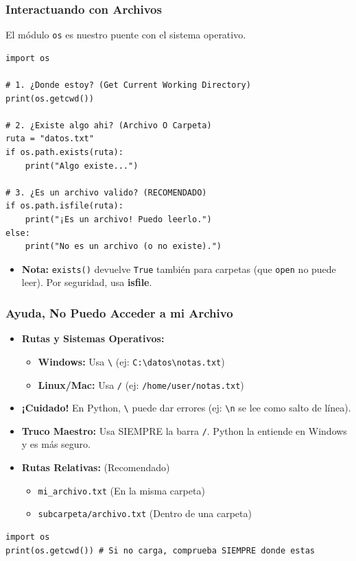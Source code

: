 \documentclass[11pt]{beamer}
\begin{document}
\begin{frame}[fragile]\frametitle{Interactuando con Archivos}
El módulo \lstinline|os| es nuestro puente con el sistema operativo.
\begin{lstlisting}[basicstyle=\scriptsize]
import os

# 1. ¿Donde estoy? (Get Current Working Directory)
print(os.getcwd())

# 2. ¿Existe algo ahi? (Archivo O Carpeta)
ruta = "datos.txt"
if os.path.exists(ruta):
    print("Algo existe...")

# 3. ¿Es un archivo valido? (RECOMENDADO)
if os.path.isfile(ruta):
    print("¡Es un archivo! Puedo leerlo.")
else:
    print("No es un archivo (o no existe).")
\end{lstlisting}
\begin{itemize}\scriptsize
    \item \textbf{Nota:} \lstinline|exists()| devuelve \lstinline|True| también para carpetas (que \lstinline|open| no puede leer). Por seguridad, usa \textbf{isfile}.
\end{itemize}
\end{frame}

\begin{frame}[fragile]\frametitle{Ayuda, No Puedo Acceder a mi Archivo}
\begin{itemize}
\item \textbf{Rutas y Sistemas Operativos:}
    \begin{itemize}
    \item \textbf{Windows:} Usa \lstinline|\| (ej: \verb*|C:\datos\notas.txt|)
    \item \textbf{Linux/Mac:} Usa \lstinline|/| (ej: \verb*|/home/user/notas.txt|)
    \end{itemize}
\item \textbf{¡Cuidado!} En Python, \lstinline|\| puede dar errores (ej: \lstinline|\n| se lee como salto de línea).
\item \textbf{Truco Maestro:} Usa SIEMPRE la barra \lstinline|/|. Python la entiende en Windows y es más seguro.
\item \textbf{Rutas Relativas:} (Recomendado)
    \begin{itemize}
    \item \verb*|mi_archivo.txt| (En la misma carpeta)
    \item \verb*|subcarpeta/archivo.txt| (Dentro de una carpeta)
    \end{itemize}
\end{itemize}
\begin{lstlisting}[basicstyle=\tiny]
import os
print(os.getcwd()) # Si no carga, comprueba SIEMPRE donde estas
\end{lstlisting}
\end{frame}
\end{document}
